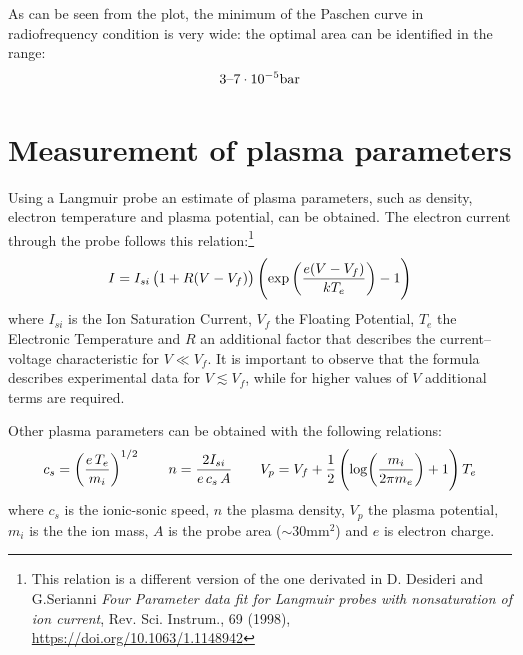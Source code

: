 \documentclass[11pt,a4 paper]{article}
\let\oldfrac\frac
\renewcommand{\frac}[3][d]{\ifthenelse{\equal{#1}{d}}{\oldfrac{#2}{#3}}{\nicefrac{#2}{#3}}}
\begin{document}

As can be seen from the plot, the minimum of the Paschen curve in radiofrequency condition is very wide: the optimal area can be identified in the range: $$3\textup{--}7 \cdot 10^{-5}\si{\bar}$$

\section{Measurement of plasma parameters}
Using a Langmuir probe an estimate of plasma parameters, such as density, electron temperature and plasma potential, can be obtained.
The electron current through the probe follows this relation:\footnote{This relation is a different version of the one derivated in D. Desideri and G.Serianni \emph{Four Parameter data fit for Langmuir probes with nonsaturation of ion current}, Rev. Sci. Instrum., 69 (1998), \url{https://doi.org/10.1063/1.1148942}}
\[I=I_{si}\left(1+R(V-V_f)\right)\left(\exp\left(\frac{e(V-V_f)}{kT_e}\right)-1\right)\]
where $I_{si}$ is the Ion Saturation Current, $V_f$ the Floating Potential, $T_e$ the Electronic Temperature and $R$ an additional factor that describes the current--voltage characteristic for $V\ll V_f$.
It is important to observe that the formula describes experimental data for $V\lesssim V_f$, while for higher values of $V$ additional terms are required.

Other plasma parameters can be obtained with the following relations:
\begin{equation*}
  c_s=\left(\frac{e\,T_e}{m_i}\right)^{1/2} \qquad
  n=\frac{2I_{si}}{e\,c_s\,A} \qquad
  V_p=V_f+\frac12\left(\log(\frac{m_i}{2\pi m_e})+1\right) T_e
\end{equation*}
where $c_s$ is the ionic-sonic speed, $n$ the plasma density, $V_p$ the plasma potential, $m_i$ is the the ion mass, $A$ is the probe area ($\sim30\si{\milli\metre}^2$) and $e$ is electron charge.
\end{document}
